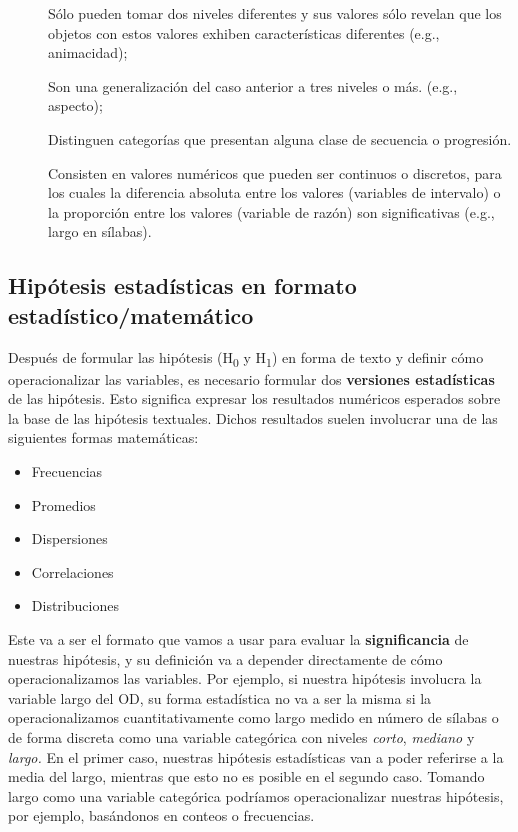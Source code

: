 \documentclass[authoryear,a4paper, 14pt]{scrartcl}
\begin{document}
\begin{description}
    \item[\label=\small{Variable nominal (o binaria)}:]
    Sólo pueden tomar dos niveles diferentes y sus valores sólo revelan que
    los objetos con estos valores exhiben características diferentes (e.g.,
    animacidad);
    \item[\label=\small{Variable categórica:}]
    Son una generalización del caso anterior a tres niveles o más.
    (e.g., aspecto);
    \item[\label=\small{Variable ordinal:}]
    Distinguen categorías que presentan alguna clase de secuencia o progresión.
    \item[\label=\small{Variable cuantitativa:}]
    Consisten en valores numéricos que pueden ser continuos o discretos, para los cuales la diferencia absoluta entre los valores (variables de intervalo) o la proporción entre los valores (variable de razón) son significativas (e.g., largo en sílabas).
\end{description}

\hypertarget{hipotesis-estadisticas-en-formato-estadisticomatematico}{%
\subsection{Hipótesis estadísticas en formato
estadístico/matemático}\label{hipotesis-estadisticas-en-formato-estadisticomatematico}}

Después de formular las hipótesis (H\textsubscript{0} y
H\textsubscript{1}) en forma de texto y definir cómo operacionalizar las
variables, es necesario formular dos \textbf{versiones estadísticas} de
las hipótesis. Esto significa expresar los resultados numéricos
esperados sobre la base de las hipótesis textuales. Dichos resultados
suelen involucrar una de las siguientes formas matemáticas:

\begin{itemize}
    \item Frecuencias
    \item Promedios
    \item Dispersiones
    \item Correlaciones
    \item Distribuciones
\end{itemize}

Este va a ser el formato que vamos a usar para evaluar la
\textbf{significancia} de nuestras hipótesis, y su
definición va a depender directamente de cómo operacionalizamos las
variables. Por ejemplo, si nuestra hipótesis involucra la variable largo
del OD, su forma estadística no va a ser la misma si la operacionalizamos
cuantitativamente como largo medido en número de sílabas o de forma
discreta como una variable categórica con niveles \emph{corto},
\emph{mediano} y \emph{largo.} En el primer caso, nuestras hipótesis
estadísticas van a poder referirse a la media del largo, mientras que
esto no es posible en el segundo caso. Tomando largo como una variable
categórica podríamos operacionalizar nuestras hipótesis, por ejemplo,
basándonos en conteos o frecuencias.
\end{document}
